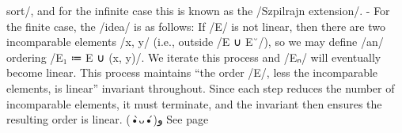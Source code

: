 \documentclass[11pt]{article}
\begin{document}
sort/, and for the infinite case this is known as the /Szpilrajn extension/.  - For the finite case, the /idea/ is as follows: If /E/ is not linear, then there  \quad are two incomparable elements /x, y/ (i.e., outside /E ∪ E˘/), so we may define  \quad /an/ ordering /E₁ ≔ E ∪ {(x, y)}/. We iterate this process and /Eₙ/ will  \quad eventually become linear.   \quad This process maintains “the order /E/, less the incomparable elements, is  \quad linear” invariant throughout. Since each step reduces the number of  \quad incomparable elements, it must terminate, and the invariant then ensures the  \quad resulting order is linear. (•̀ᴗ•́)و See page \pageref{org-special-block-extras-glossary-declaration-site-Linear}
\end{document}
